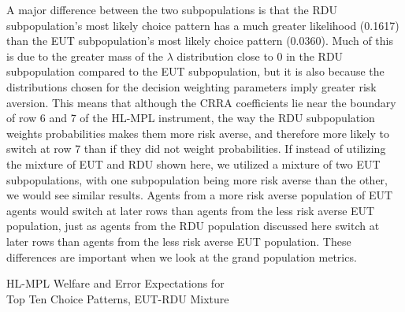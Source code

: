 \documentclass[../main.tex]{subfiles}
\begin{document}
A major difference between the two subpopulations is that the RDU subpopulation's most likely choice pattern has a much greater likelihood (0.1617) than the EUT subpopulation's most likely choice pattern (0.0360).
Much of this is due to the greater mass of the $\lambda$ distribution close to $0$ in the RDU subpopulation compared to the EUT subpopulation, but it is also because the distributions chosen for the decision weighting parameters imply greater risk aversion.
This means that although the CRRA coefficients lie near the boundary of row 6 and 7 of the HL-MPL instrument, the way the RDU subpopulation weights probabilities makes them more risk averse, and therefore more likely to switch at row 7 than if they did not weight probabilities.
If instead of utilizing the mixture of EUT and RDU shown here, we utilized a mixture of two EUT subpopulations, with one subpopulation being more risk averse than the other, we would see similar results.
Agents from a more risk averse population of EUT agents would switch at later rows than agents from the less risk averse EUT population, just as agents from the RDU population discussed here switch at later rows than agents from the less risk averse EUT population.
These differences are important when we look at the grand population metrics.

\begin{table}[ht]
	\centering
	\caption{HL-MPL Welfare and Error Expectations for\\Top Ten Choice Patterns, EUT-RDU Mixture}
	\label{tb:TopTenMIX}
	\begin{adjustbox}{width=1\textwidth}
	\end{adjustbox}
\end{table}
\end{document}
